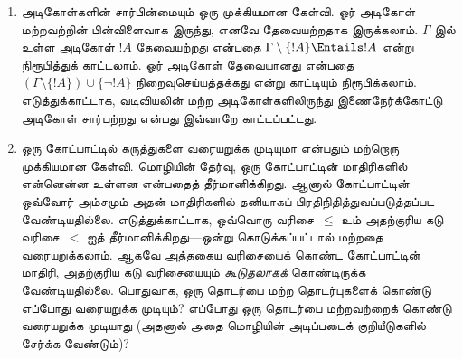 \documentclass[../../../include/open-logic-section]{subfiles}
\begin{document}
\begin{explain}
\begin{enumerate}
  இருக்க முடியாது; அப்போது நாம் ஒத்திசைவற்ற ஒரு கோட்பாட்டை அமைக்க
  முயன்றிருப்போம். $\Gamma$ இன் ஒரு மாதிரியைக் கண்டறிவதன் மூலம் இது
  நிகழவில்லை என்பதைச் சரிபார்க்கலாம். நமது கோட்பாட்டிற்கு மாதிரிகள்
  இருந்தால், தருக்க முறைகளால் அவற்றை ஆராயவும் புதிய மாதிரிகளை
  உருவாக்கவும் முடியும்.
\item அடிகோள்களின் சார்பின்மையும் ஒரு முக்கியமான கேள்வி. ஓர் அடிகோள்
  மற்றவற்றின் பின்விளைவாக இருந்து, எனவே தேவையற்றதாக இருக்கலாம்.
  $\Gamma$ இல் உள்ள அடிகோள் $!A$ தேவையற்றது என்பதை
  $\Gamma \setminus \{!A\} \Entails !A$ என்று நிரூபித்துக் காட்டலாம்.
  ஓர் அடிகோள் தேவையானது என்பதை $(\Gamma \setminus \{!A\}) \cup \{\lnot
  !A\}$ நிறைவுசெய்யத்தக்கது என்று காட்டியும் நிரூபிக்கலாம்.
  எடுத்துக்காட்டாக, வடிவியலின் மற்ற அடிகோள்களிலிருந்து இணைநேர்க்கோட்டு
  அடிகோள் சார்பற்றது என்பது இவ்வாறே காட்டப்பட்டது.
\item ஒரு கோட்பாட்டில் கருத்துகளை வரையறுக்க முடியுமா என்பதும் மற்றொரு
  முக்கியமான கேள்வி. மொழியின் தேர்வு, ஒரு கோட்பாட்டின் மாதிரிகளில்
  என்னென்ன உள்ளன என்பதைத் தீர்மானிக்கிறது. ஆனால் கோட்பாட்டின் ஒவ்வோர்
  அம்சமும் அதன் மாதிரிகளில் தனியாகப் பிரதிநிதித்துவப்படுத்தப்பட வேண்டியதில்லை.
  எடுத்துக்காட்டாக, ஒவ்வொரு வரிசை~$\le$ உம் அதற்குரிய கடு வரிசை~$<$
  ஐத் தீர்மானிக்கிறது---ஒன்று கொடுக்கப்பட்டால் மற்றதை வரையறுக்கலாம்.
  ஆகவே அத்தகைய வரிசையைக் கொண்ட கோட்பாட்டின் மாதிரி, அதற்குரிய கடு
  வரிசையையும் \emph{கூடுதலாகக்} கொண்டிருக்க வேண்டியதில்லை. பொதுவாக,
  ஒரு தொடர்பை மற்ற தொடர்புகளைக் கொண்டு எப்போது வரையறுக்க முடியும்?
  எப்போது ஒரு தொடர்பை மற்றவற்றைக் கொண்டு வரையறுக்க முடியாது
  (அதனால் அதை மொழியின் அடிப்படைக் குறியீடுகளில் சேர்க்க வேண்டும்)?
\end{enumerate}
\end{explain}
\end{document}
